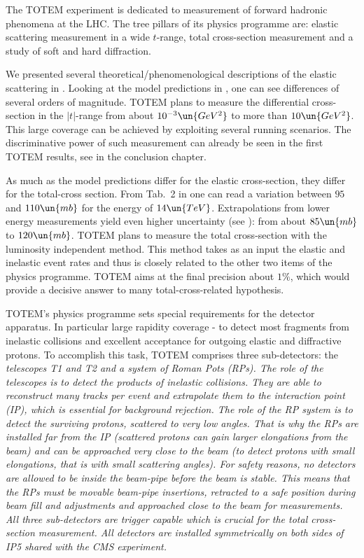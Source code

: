 The TOTEM experiment  is dedicated to measurement of forward hadronic phenomena at the LHC. The tree pillars of its physics programme are: elastic scattering measurement in a wide $t$-range, total cross-section measurement and a study of soft and hard diffraction.

We presented several theoretical/phenomenological descriptions of the elastic scattering in . Looking at the model predictions in , one can see differences of several orders of magnitude. TOTEM plans to measure the differential cross-section in the $|t|$-range from about $10^{-3}\un{GeV^2}$ to more than $10\un{GeV^2}$. This large coverage can be achieved by exploiting several running scenarios. The discriminative power of such measurement can already be seen in the first TOTEM results, see  in the conclusion chapter.

As much as the model predictions differ for the elastic cross-section, they differ for the total-cross section. From Tab.~2 in  one can read a variation between $95$ and $110\un{mb}$ for the energy of $14\un{TeV}$. Extrapolations from lower energy measurements yield even higher uncertainty (see ): from about $85\un{mb}$ to $120\un{mb}$. TOTEM plans to measure the total cross-section with the luminosity independent method. This method takes as an input the elastic and inelastic event rates and thus is closely related to the other two items of the physics programme. TOTEM aims at the final precision about $1\percent$, which would provide a decisive answer to many total-cross-related hypothesis.

TOTEM's physics programme sets special requirements for the detector apparatus. In particular large rapidity coverage - to detect most fragments from inelastic collisions and excellent acceptance for outgoing elastic and diffractive protons. To accomplish this task, TOTEM comprises three sub-detectors: the \em{telescopes T1 and T2} and a system of \em{Roman Pots} (RPs). The role of the telescopes is to detect the products of inelastic collisions. They are able to reconstruct many tracks per event and extrapolate them to the interaction point (IP), which is essential for background rejection. The role of the RP system is to detect the surviving protons, scattered to very low angles. That is why the RPs are installed far from the IP (scattered protons can gain larger elongations from the beam) and can be approached very close to the beam (to detect protons with small elongations, that is with small scattering angles). For safety reasons, no detectors are allowed to be inside the beam-pipe before the beam is stable. This means that the RPs must be movable beam-pipe insertions, retracted to a safe position during beam fill and adjustments and approached close to the beam for measurements. All three sub-detectors are trigger capable which is crucial for the total cross-section measurement. All detectors are installed symmetrically on both sides of IP5 shared with the CMS experiment.

